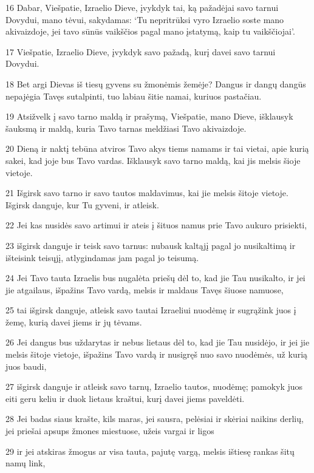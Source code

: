 \par 16 Dabar, Viešpatie, Izraelio Dieve, įvykdyk tai, ką pažadėjai savo tarnui Dovydui, mano tėvui, sakydamas: ‘Tu nepritrūksi vyro Izraelio soste mano akivaizdoje, jei tavo sūnūs vaikščios pagal mano įstatymą, kaip tu vaikščiojai’. 
\par 17 Viešpatie, Izraelio Dieve, įvykdyk savo pažadą, kurį davei savo tarnui Dovydui. 
\par 18 Bet argi Dievas iš tiesų gyvens su žmonėmis žemėje? Dangus ir dangų dangūs nepajėgia Tavęs sutalpinti, tuo labiau šitie namai, kuriuos pastačiau. 
\par 19 Atsižvelk į savo tarno maldą ir prašymą, Viešpatie, mano Dieve, išklausyk šauksmą ir maldą, kuria Tavo tarnas meldžiasi Tavo akivaizdoje. 
\par 20 Dieną ir naktį tebūna atviros Tavo akys tiems namams ir tai vietai, apie kurią sakei, kad joje bus Tavo vardas. Išklausyk savo tarno maldą, kai jis melsis šioje vietoje. 
\par 21 Išgirsk savo tarno ir savo tautos maldavimus, kai jie melsis šitoje vietoje. Išgirsk danguje, kur Tu gyveni, ir atleisk. 
\par 22 Jei kas nusidės savo artimui ir ateis į šituos namus prie Tavo aukuro prisiekti, 
\par 23 išgirsk danguje ir teisk savo tarnus: nubausk kaltąjį pagal jo nusikaltimą ir išteisink teisųjį, atlygindamas jam pagal jo teisumą. 
\par 24 Jei Tavo tauta Izraelis bus nugalėta priešų dėl to, kad jie Tau nusikalto, ir jei jie atgailaus, išpažins Tavo vardą, melsis ir maldaus Tavęs šiuose namuose, 
\par 25 tai išgirsk danguje, atleisk savo tautai Izraeliui nuodėmę ir sugrąžink juos į žemę, kurią davei jiems ir jų tėvams. 
\par 26 Jei dangus bus uždarytas ir nebus lietaus dėl to, kad jie Tau nusidėjo, ir jei jie melsis šitoje vietoje, išpažins Tavo vardą ir nusigręš nuo savo nuodėmės, už kurią juos baudi, 
\par 27 išgirsk danguje ir atleisk savo tarnų, Izraelio tautos, nuodėmę; pamokyk juos eiti geru keliu ir duok lietaus kraštui, kurį davei jiems paveldėti. 
\par 28 Jei badas siaus krašte, kils maras, jei sausra, pelėsiai ir skėriai naikins derlių, jei priešai apsups žmones miestuose, užeis vargai ir ligos 
\par 29 ir jei atskiras žmogus ar visa tauta, pajutę vargą, melsis ištiesę rankas šitų namų link, 
